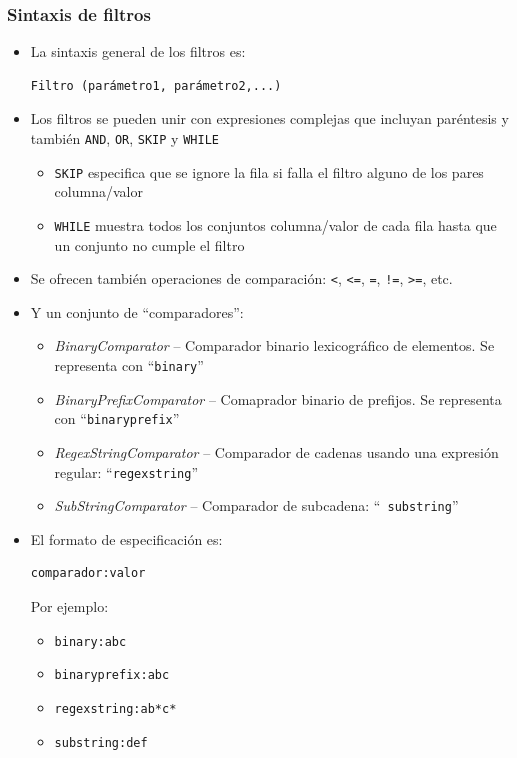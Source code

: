\documentclass[14pt]{beamer}
\begin{document}
\begin{frame}
  \frametitle{Sintaxis de filtros}
  \begin{itemize}
  \item La sintaxis general de los filtros es:

\begin{verbatim}
Filtro (parámetro1, parámetro2,...)
\end{verbatim}

  \item Los filtros se pueden unir con expresiones complejas que incluyan
    paréntesis y también {\tt AND}, {\tt OR}, {\tt SKIP} y {\tt WHILE}
    \begin{itemize}
    \item {\tt SKIP} especifica que se ignore la fila si falla el filtro
      alguno de los pares columna/valor
    \item {\tt WHILE} muestra todos los conjuntos columna/valor de cada
      fila hasta que un conjunto no cumple el filtro
    \end{itemize}

  \item Se ofrecen también operaciones de comparación: \verb|<|, \verb|<=|,
    \verb|=|, \verb|!=|, \verb|>=|, etc.

\framebreak

  \item Y un conjunto de ``comparadores'':

    \begin{itemize}
    \item {\em BinaryComparator} -- Comparador binario lexicográfico de
      elementos. Se representa con ``{\tt binary}''
    \item {\em BinaryPrefixComparator} -- Comaprador binario de prefijos.
      Se representa con ``{\tt binaryprefix}''
    \item {\em RegexStringComparator} -- Comparador de cadenas usando una
      expresión regular: ``{\tt regexstring}''
    \item {\em SubStringComparator} -- Comparador de subcadena: ``{\tt
        substring}''
    \end{itemize}

\framebreak

  \item El formato de especificación es:

\begin{verbatim}
comparador:valor
\end{verbatim}

    Por ejemplo:

    \begin{itemize}
    \item {\tt binary:abc}
    \item {\tt binaryprefix:abc}
    \item {\tt regexstring:ab*c*}
    \item {\tt substring:def}
    \end{itemize}

  \end{itemize}
\end{frame}
\end{document}
